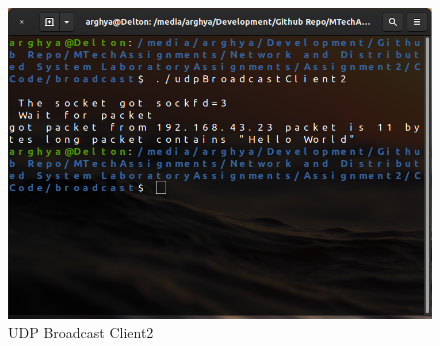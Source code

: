 \documentclass{article}
\begin{document}
\begin{enumerate}
\begin{figure}[h]
\centering
\includegraphics[width=500pt]{Output002}
\caption{UDP Broadcast Client2}
\label{UDPBroadcastClient2}
\end{figure}

\end{enumerate}
\end{document}
